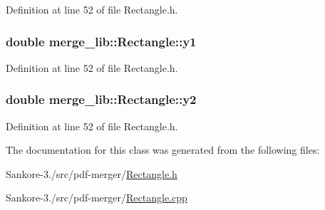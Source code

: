 Definition at line 52 of file Rectangle.\-h.

\hypertarget{classmerge__lib_1_1_rectangle_a2fd7bfb16e5ea70e0a9546b8ce13ff31}{
\subsubsection[{y1}]{\setlength{\rightskip}{0pt plus 5cm}double merge\-\_\-lib\-::\-Rectangle\-::y1}}\label{da/d60/classmerge__lib_1_1_rectangle_a2fd7bfb16e5ea70e0a9546b8ce13ff31}


Definition at line 52 of file Rectangle.\-h.

\hypertarget{classmerge__lib_1_1_rectangle_a29e8913a7de8214057c8eae5045695e5}{
\subsubsection[{y2}]{\setlength{\rightskip}{0pt plus 5cm}double merge\-\_\-lib\-::\-Rectangle\-::y2}}\label{da/d60/classmerge__lib_1_1_rectangle_a29e8913a7de8214057c8eae5045695e5}


Definition at line 52 of file Rectangle.\-h.



The documentation for this class was generated from the following files\-:\begin{DoxyCompactItemize}
\item 
Sankore-\/3./src/pdf-\/merger/\hyperlink{_rectangle_8h}{Rectangle.\-h}\item 
Sankore-\/3./src/pdf-\/merger/\hyperlink{_rectangle_8cpp}{Rectangle.\-cpp}\end{DoxyCompactItemize}
